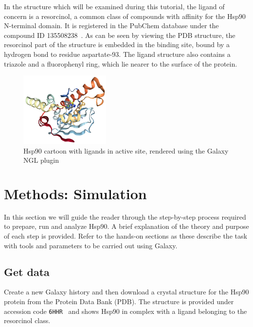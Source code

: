 \documentclass[twocolumn]{bmcart}%
\begin{document}
In the structure which will be examined during this tutorial, the ligand of concern is a resorcinol, a common class of compounds with affinity for the Hsp90 N-terminal domain. It is registered in the PubChem database under the compound ID 135508238~\cite{ligand_resorcinol}. As can be seen by viewing the PDB structure, the resorcinol part of the structure is embedded in the binding site, bound by a hydrogen bond to residue aspartate-93. The ligand structure also contains a triazole and a fluorophenyl ring, which lie nearer to the surface of the protein.

\begin{figure}[ht!]
  \includegraphics[width=0.4\textwidth]{hsp90lig}
    \caption{
    Hsp90 cartoon with ligands in active site, rendered using the Galaxy NGL plugin~\cite{Rose2018ngl}}
\label{fig:Hsp90}
 \end{figure}

\hypertarget{methods}{%
\section*{Methods: Simulation}\label{methods}}
In this section we will guide the reader through the step-by-step process required to prepare, run and analyze Hsp90. A brief explanation of the theory and purpose of each step is provided. Refer to the hands-on sections as these describe the task with tools and parameters to be carried out using Galaxy. 


\subsection*{Get data}\label{get-data}

Create a new Galaxy history and then download a crystal structure for the Hsp90 protein from the Protein Data Bank (PDB). The structure is provided under accession code \texttt{6HHR}~\cite{Schuetz2018} and shows Hsp90 in complex with a ligand belonging to the resorcinol class.
\end{document}
